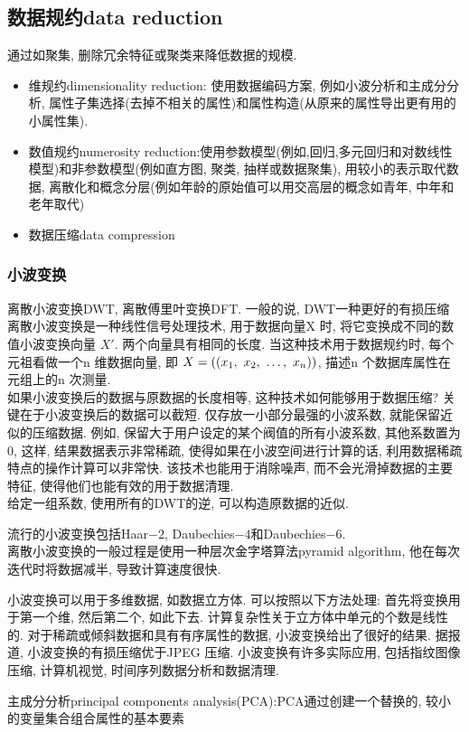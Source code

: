 \documentclass{article}
\begin{document}
\subsection{数据规约data reduction}
通过如聚集, 删除冗余特征或聚类来降低数据的规模.
\begin{itemize}
	\item 维规约dimensionality reduction: 使用数据编码方案, 例如小波分析和主成分分析, 属性子集选择(去掉不相关的属性)和属性构造(从原来的属性导出更有用的小属性集).
	\item 数值规约numerosity reduction:使用参数模型(例如,回归,多元回归和对数线性模型)和非参数模型(例如直方图, 聚类, 抽样或数据聚集), 用较小的表示取代数据, 离散化和概念分层(例如年龄的原始值可以用交高层的概念如青年, 中年和老年取代)
	\item 数据压缩data compression
\end{itemize}
\subsubsection{小波变换}
离散小波变换DWT, 离散傅里叶变换DFT. 一般的说, DWT一种更好的有损压缩
离散小波变换是一种线性信号处理技术, 用于数据向量X 时, 将它变换成不同的数值小波变换向量 $X'$. 两个向量具有相同的长度. 当这种技术用于数据规约时, 每个元祖看做一个n 维数据向量, 即 $X = ((x_1,~x_2,~\ldots,~x_n))$, 描述n 个数据库属性在元组上的n 次测量.\\
如果小波变换后的数据与原数据的长度相等, 这种技术如何能够用于数据压缩? 关键在于小波变换后的数据可以截短. 仅存放一小部分最强的小波系数, 就能保留近似的压缩数据. 
例如, 保留大于用户设定的某个阀值的所有小波系数, 其他系数置为0, 这样, 结果数据表示非常稀疏, 使得如果在小波空间进行计算的话, 利用数据稀疏特点的操作计算可以非常快.
该技术也能用于消除噪声, 而不会光滑掉数据的主要特征, 使得他们也能有效的用于数据清理.\\
给定一组系数, 使用所有的DWT的逆, 可以构造原数据的近似.

流行的小波变换包括Haar$-2$, Daubechies$-4$和Daubechies$-6$. \\
离散小波变换的一般过程是使用一种层次金字塔算法pyramid algorithm, 他在每次迭代时将数据减半, 导致计算速度很快.

小波变换可以用于多维数据, 如数据立方体. 可以按照以下方法处理: 首先将变换用于第一个维, 然后第二个, 如此下去. 计算复杂性关于立方体中单元的个数是线性的.
对于稀疏或倾斜数据和具有有序属性的数据, 小波变换给出了很好的结果. 据报道, 小波变换的有损压缩优于JPEG 压缩. 
小波变换有许多实际应用, 包括指纹图像压缩, 计算机视觉, 时间序列数据分析和数据清理.

主成分分析principal components analysis(PCA):PCA通过创建一个替换的, 较小的变量集合组合属性的基本要素
\end{document}
